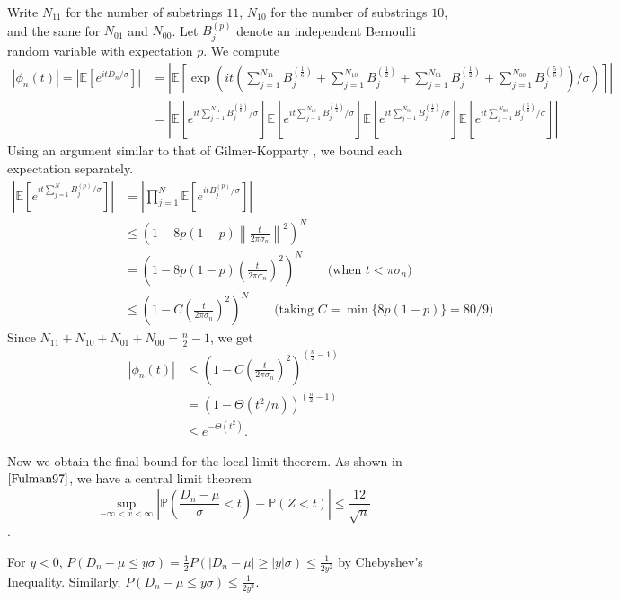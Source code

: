 \documentclass[12pt]{article} %
\newcommand{\f}[2]{\frac{#1}{#2}}
\newcommand{\p}[1]{\left(#1\right)}
\newcommand{\s}[1]{\left[#1\right]}
\newcommand{\abs}[1]{\left\lvert#1\right\rvert}
\renewcommand{\P}{\mathbb{P}}
\newcommand{\E}{\mathbb{E}}
\newcommand{\norm}[1]{\left\lVert#1\right\rVert}
\theoremstyle{definition}
\theoremstyle{remark}
\begin{document}
	Write $N_{11}$ for the number of substrings $11$, $N_{10}$ for the number of substrings $10$, and the same for $N_{01}$ and $N_{00}$. Let $B^{(p)}_j$ denote an independent Bernoulli random variable with expectation $p$. We compute
	\begin{align*}
		\abs{\phi_n(t)}
		= \abs{\E \s{e^{it D_n/\sigma}}}
		&= \abs{\E \s{\exp\p{it\p{\sum_{j=1}^{N_{11}} B^{(\f{1}{6})}_j + \sum_{j=1}^{N_{10}} B^{(\f{1}{2})}_j + \sum_{j=1}^{N_{01}} B^{(\f{1}{2})}_j + \sum_{j=1}^{N_{00}} B^{(\f{5}{6})}_j}/\sigma}}} \\
		&= \abs{
			\E \s{e^{it\sum_{j=1}^{N_{11}} B^{(\f{1}{6})}_j/\sigma}}
			\E \s{e^{it\sum_{j=1}^{N_{10}} B^{(\f{1}{2})}_j/\sigma}}
			\E \s{e^{it\sum_{j=1}^{N_{01}} B^{(\f{1}{2})}_j/\sigma}}
			\E \s{e^{it\sum_{j=1}^{N_{00}} B^{(\f{5}{6})}_j/\sigma}}
		}
	\end{align*}
	Using an argument similar to that of Gilmer-Kopparty \cite{GilmerKopparty14}, we bound each expectation separately.
	\begin{align*}
		\abs{\E \s{e^{it \sum_{j=1}^{N} B^{(p)}_j/\sigma}}}
		&= \abs{\prod_{j=1}^{N} \E \s{e^{it B^{(p)}_j/\sigma}}} \\
		&\leq \p{1 - 8p(1-p) \norm{\f{t}{2\pi \sigma_n}}^2}^N \\
		&= \p{1 - 8p(1-p) \p{\f{t}{2\pi \sigma_n}}^2}^N \qquad \text{(when $t < \pi \sigma_n$)} \\
		&\leq \p{1 - C \p{\f{t}{2\pi \sigma_n}}^2}^N \qquad \text{(taking $C = \min{\{8p(1-p)\}} = 80/9$)}
	\end{align*}
	Since $N_{11} + N_{10} + N_{01} + N_{00} = \f{n}{2} - 1$, we get
	\begin{align*}
		\abs{\phi_n(t)}
		&\leq \p{1 - C \p{\f{t}{2\pi \sigma_n}}^2}^{(\f{n}{2} - 1)} \\
		&= \p{1 - \Theta(t^2/n)}^{(\f{n}{2} - 1)} \\
		&\leq e^{-\Theta(t^2)}.
	\end{align*}
    

	Now we obtain the final bound for the local limit theorem. As shown in $\cite{Fulman97}$, we have a central limit theorem 
\[ \sup_{ -\infty < x < \infty} \abs{\P(\f{D_n - \mu}{\sigma} < t) - \P(Z < t)} \leq \f{12}{\sqrt{n}} \].

For $y<0$, $P(D_n-\mu \leq y\sigma) = \frac{1}{2} P(\abs{D_n-\mu} \geq \abs{y}\sigma) \leq \frac{1}{2y^2}$ by Chebyshev's Inequality. Similarly, $P(D_n-\mu \leq y\sigma) \leq \frac{1}{2y^2}$. 
\end{document}
